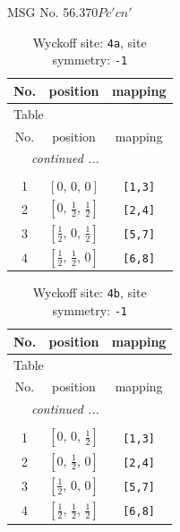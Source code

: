 \documentclass[fleqn,8pt]{jsarticle}
\begin{document}
\setcounter{MaxMatrixCols}{32}

\renewcommand{\tablename}{Table~}
\renewcommand{\figurename}{Figure~}
\begin{center}
\LARGE
MSG No. 56.370\quad$Pc'cn'$
\end{center}
\renewcommand{\arraystretch}{1.2}
\begin{longtable}{ccc}
\caption{Wyckoff site: {\tt 4a}, site symmetry: {\tt -1}}
 \\
 \hline \hline
No. & position & mapping \\ \hline \endfirsthead

\multicolumn{2}{l}{\tablename\ \thetable{}} \\
 \hline \hline
No. & position & mapping \\ \hline \endhead

 \hline \hline
\multicolumn{2}{r}{\footnotesize\it continued ...} \\ \endfoot

 \hline \hline
\multicolumn{2}{r}{} \\ \endlastfoot

1 & $\left[ 0,\, 0,\, 0 \right]$ & {\tt [1,3]} \\ \hline
2 & $\left[ 0,\, \frac{1}{2},\, \frac{1}{2} \right]$ & {\tt [2,4]} \\ \hline
3 & $\left[ \frac{1}{2},\, 0,\, \frac{1}{2} \right]$ & {\tt [5,7]} \\ \hline
4 & $\left[ \frac{1}{2},\, \frac{1}{2},\, 0 \right]$ & {\tt [6,8]} \\
\end{longtable}
\renewcommand{\arraystretch}{1.2}
\begin{longtable}{ccc}
\caption{Wyckoff site: {\tt 4b}, site symmetry: {\tt -1}}
 \\
 \hline \hline
No. & position & mapping \\ \hline \endfirsthead

\multicolumn{2}{l}{\tablename\ \thetable{}} \\
 \hline \hline
No. & position & mapping \\ \hline \endhead

 \hline \hline
\multicolumn{2}{r}{\footnotesize\it continued ...} \\ \endfoot

 \hline \hline
\multicolumn{2}{r}{} \\ \endlastfoot

1 & $\left[ 0,\, 0,\, \frac{1}{2} \right]$ & {\tt [1,3]} \\ \hline
2 & $\left[ 0,\, \frac{1}{2},\, 0 \right]$ & {\tt [2,4]} \\ \hline
3 & $\left[ \frac{1}{2},\, 0,\, 0 \right]$ & {\tt [5,7]} \\ \hline
4 & $\left[ \frac{1}{2},\, \frac{1}{2},\, \frac{1}{2} \right]$ & {\tt [6,8]} \\
\end{longtable}
\end{document}
